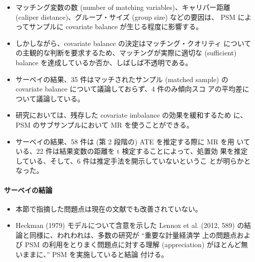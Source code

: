 \begin{itemize}
 \item マッチング変数の数 (number of matching variables)、キャリパー距離
       (caliper distance)、グループ・サイズ (group size) などの要因は、
       PSM によってサンプルに covariate balance が生じる程度に影響する。
 \item しかしながら、covariate balance の決定はマッチング・クオリティ
       についての主観的な判断を要求するため、マッチングが実際に適切な
       (sufficient) balance を達成しているか否か、しばしば不透明である。
 \item サーベイの結果、35 件はマッチされたサンプル (matched sample) の
       covariate balance について議論しておらず、4 件のみ傾向スコ
       アの平均差について議論している。
 \item 研究においては、残存した covariate imbalance の効果を緩和するため
       に、PSM のサブサンプルにおいて MR を使うことができる。
 \item サーベイの結果、58 件は (第 2 段階の) ATE を推定する際に MR を用
       いている、22 件は結果変数の距離を t 検定することによって、処置効
       果を推定している、そして、6 件は推定手法を開示していないというこ
       とが明らかとなった。
\end{itemize}

\paragraph{サーベイの結論}

\begin{itemize}
 \item 本節で指摘した問題点は現在の文献でも改善されていない。
 \item Heckman (1979) モデルについて含意を示した Lennox et al. (2012,
       589) の結論と同様に、われわれは、多数の研究が ``重要な計量経済学
       上の問題点および PSM の利用をとりまく問題点に対する理解
       (appreciation) がほとんど無いままに、'' PSM を実施していると結論
       付ける。 
\end{itemize}